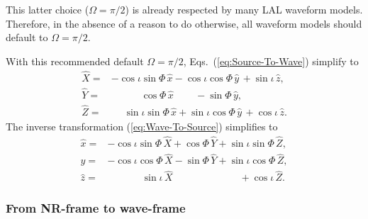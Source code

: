 \documentclass[aps,prd,amssymb,amsmath,amsfonts,superscriptaddress,
floatfix ,preprintnumbers,altaffilletter]{revtex4}
\newcommand{\ExS}{{{\hat x}}}
\newcommand{\EyS}{{{\hat y}}}
\newcommand{\EzS}{{{\hat z}}}
\newcommand{\ExW}{\hat X}
\newcommand{\EyW}{\hat Y}
\newcommand{\EzW}{\hat Z}
\newcommand{\phiRef}{\Phi} %
\begin{document}
This latter choice ($\Omega=\pi/2$) is already respected by many LAL
waveform models.  Therefore, in the absence of a reason to do
otherwise, all waveform models should default to $\Omega=\pi/2$.  

With this recommended default $\Omega=\pi/2$,
Eqs.~(\ref{eq:Source-To-Wave}) simplify to
\begin{subequations}
  \label{eq:Source-To-Wave-Omega0}
  \begin{align}
    \ExW=& -\cos\iota\sin\phiRef\,\ExS-\cos\iota\cos\phiRef\,\EyS\,+\sin\iota\,\EzS,\\
    \EyW=&\qquad\quad \cos\phiRef\,\ExS\qquad\,-\sin\phiRef\,\EyS,\\
\label{eq:Z_from_z-Omega0}
\EzW=&\;\;\;\;\,\sin\iota\sin\phiRef\,\ExS+\sin\iota\cos\phiRef\,\EyS\, + \cos\iota\,\EzS.
  \end{align}
  \end{subequations}
The inverse transformation (\ref{eq:Wave-To-Source}) simplifies to 
\begin{subequations}
  \label{eq:Wave-To-Source-Omega0}
  \begin{align}
    \ExS=& -\cos\iota\sin\phiRef\,\ExW+\cos\phiRef\,\EyW
    + \sin\iota\sin\phiRef\,\EzW,\\
    \EyS=& -\cos\iota\cos\phiRef\,\ExW-\sin\phiRef\,\EyW
    + \sin\iota\cos\phiRef\,\EzW,\\
    \EzS=&\qquad\quad\;\,\sin\iota\,\ExW \qquad\qquad\qquad\;\;\,+\cos\iota\,\EzW.
  \end{align}
  \end{subequations}


\subsubsection{From NR-frame to wave-frame}
\end{document}
